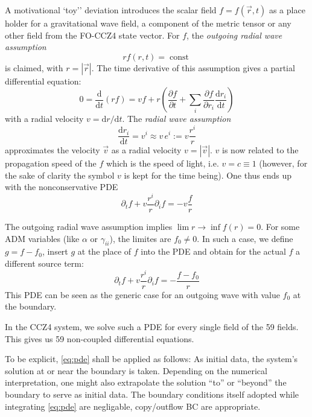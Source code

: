 A motivational `toy'' deviation introduces the scalar field $f=f(\vec r,t)$
as a place holder for a gravitational wave field, a component of the metric
tensor or any other field from the FO-CCZ4 state vector. For $f$, the
\emph{outgoing radial wave assumption}
\begin{equation}
r f(r,t) = \operatorname{const}
\end{equation}
is claimed, with $r=|\vec r|$. The time derivative of this assumption gives 
a partial differential equation:
\begin{equation}
0 = \frac{\mathrm d}{\mathrm d t} (r f)
   = v f + r \left( \frac{\partial f}{\partial t} + \sum_i \frac{\partial f}{\partial r_i} \frac{\mathrm d r_i}{\mathrm d t} \right)
\end{equation}
with a radial velocity $v=\mathrm d r / \mathrm d t$. The \emph{radial wave 
assumption}
\begin{equation}
\frac{\mathrm d r_i}{\mathrm d t} = v^i \approx v \, e^i := v \frac{r^i}{r}
\end{equation}
approximates the velocity $\vec v$ as a radial velocity $v=|\vec v|$.
$v$ is now related to the propagation speed of the $f$ which is
the speed of light, i.e. $v=c\equiv 1$ (however, for the sake of clarity
the symbol $v$ is kept for the time being). One thus ends up with the
nonconservative PDE
\begin{equation}
\partial_t f + v \frac{r^i}{r} \partial_i f = - v \frac{f}{r}
\end{equation}

The outgoing radial wave assumption implies $\lim{r\to\inf} f(r)=0$. For
some ADM variables (like $\alpha$ or $\gamma_{ii}$), the limites are $f_0 \neq 0$. In such a case, we define $g=f-f_0$, insert $g$ at the place of $f$ into
the PDE and obtain for the actual $f$ a different source term:
\begin{equation}\label{eq:pde}
\partial_t f + v \frac{r^i}{r} \partial_i f = - \frac{f-f_0}{r}
\end{equation}
This PDE can be seen as the generic case for an outgoing wave with value $f_0$ at the boundary.

In the CCZ4 system, we solve such a PDE for every single field of the 59 fields.
This gives us 59 non-coupled differential equations.

To be explicit, \eqref{eq:pde} shall be applied as follows: As initial data,
the system's solution at or near the boundary is taken. Depending on the
numerical interpretation, one might also extrapolate the solution ``to'' or
``beyond'' the boundary to serve as initial data. The boundary conditions 
itself adopted while integrating \eqref{eq:pde} are negligable, copy/outflow
BC are appropriate.

